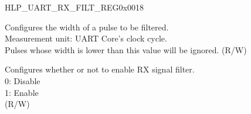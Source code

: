 \begin{register}{H}{LP\_UART\_RX\_FILT\_REG}{0x0018}\label{regdesc:LPUARTRXFILTREG}
%
%
%
\regnewline%
\begin{regdesc}\begin{reglist}
\label{fielddesc:LPUARTGLITCHFILT}\item [LP\_UART\_GLITCH\_FILT] Configures the width of a pulse to be filtered.\\Measurement unit: UART Core's clock cycle.\\Pulses whose width is lower than this value will be ignored. (R/W)
\label{fielddesc:LPUARTGLITCHFILTEN}\item [LP\_UART\_GLITCH\_FILT\_EN] Configures whether or not to enable RX signal filter.\\
0: Disable\\
1: Enable\\(R/W)
\end{reglist}\end{regdesc}
\end{register}


